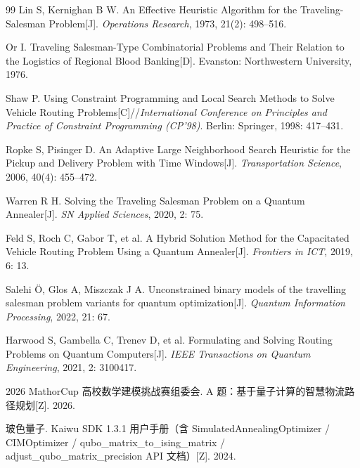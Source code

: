 \documentclass[UTF8,12pt,a4paper]{ctexart}
\begin{document}
\begin{thebibliography}{99}
Lin S, Kernighan B W. An Effective Heuristic Algorithm for the Traveling-Salesman Problem[J]. \emph{Operations Research}, 1973, 21(2): 498--516.

Or I. Traveling Salesman-Type Combinatorial Problems and Their Relation to the Logistics of Regional Blood Banking[D]. Evanston: Northwestern University, 1976.

Shaw P. Using Constraint Programming and Local Search Methods to Solve Vehicle Routing Problems[C]//\emph{International Conference on Principles and Practice of Constraint Programming (CP'98)}. Berlin: Springer, 1998: 417--431.

Ropke S, Pisinger D. An Adaptive Large Neighborhood Search Heuristic for the Pickup and Delivery Problem with Time Windows[J]. \emph{Transportation Science}, 2006, 40(4): 455--472.

Warren R H. Solving the Traveling Salesman Problem on a Quantum Annealer[J]. \emph{SN Applied Sciences}, 2020, 2: 75.

Feld S, Roch C, Gabor T, et al. A Hybrid Solution Method for the Capacitated Vehicle Routing Problem Using a Quantum Annealer[J]. \emph{Frontiers in ICT}, 2019, 6: 13.

Salehi Ö, Glos A, Miszczak J A. Unconstrained binary models of the travelling salesman problem variants for quantum optimization[J]. \emph{Quantum Information Processing}, 2022, 21: 67.

Harwood S, Gambella C, Trenev D, et al. Formulating and Solving Routing Problems on Quantum Computers[J]. \emph{IEEE Transactions on Quantum Engineering}, 2021, 2: 3100417.

2026 MathorCup 高校数学建模挑战赛组委会. A 题：基于量子计算的智慧物流路径规划[Z]. 2026.

玻色量子. Kaiwu SDK 1.3.1 用户手册（含 SimulatedAnnealingOptimizer / CIMOptimizer / qubo\_matrix\_to\_ising\_matrix / adjust\_qubo\_matrix\_precision API 文档）[Z]. 2024.

\end{thebibliography}
\end{document}
